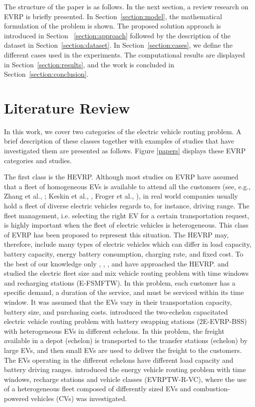 \documentclass[11pt]{article}
\begin{document}
The structure of the paper is as follows. In the next section, a review research on EVRP is briefly presented. In Section~\ref{section:model}, the mathematical formulation of the problem is shown. The proposed solution approach is introduced in Section ~\ref{section:approach} followed by the description of the dataset in Section~\ref{section:dataset}. In Section~\ref{section:cases}, we define the different cases used in the experiments. The computational results are displayed in Section~\ref{section:results}, and the work is concluded in Section~\ref{section:conclusion}.

\section{Literature Review}
In this work, we cover two categories of the electric vehicle routing problem. A brief description of these classes together with examples of studies that have investigated them are presented as follows. Figure \ref{papers} displays these EVRP categories and studies. 

The first class is the HEVRP. Although most studies on EVRP have assumed that a fleet of homogeneous EVs is available to attend all the customers (see, e.g., Zhang et al., \citeyear{zhang2018}; Keskin et al., \citeyear{keskin2019}, Froger et al., \citeyear{Froger2019}), in real world companies usually hold a fleet of diverse electric vehicles regards to, for instance, driving range. The fleet management, i.e. selecting the right EV for a certain transportation request, is highly important when the fleet of electric vehicles is heterogeneous. This class of EVRP has been proposed to represent this situation. The HEVRP may, therefore, include many types of electric vehicles which can differ in load capacity, battery capacity, energy battery consumption, charging rate, and fixed cost. To the best of our knowledge only \cite{Hiermann2016}, \cite{Penha2016}, \cite{Jie2019}, and \cite{Kopfer2019} have approached the HEVRP. \cite{Hiermann2016} and \cite{Penha2016} studied the electric fleet size and mix vehicle routing problem with time windows and recharging stations (E-FSMFTW). In this problem, each customer has a specific demand, a duration of the service, and must be serviced within its time window. It was assumed that the EVs vary in their transportation capacity, battery size, and purchasing costs. \cite{Jie2019} introduced the two-echelon capacitated electric vehicle routing problem with battery swapping stations (2E-EVRP-BSS) with heterogeneous EVs in different echelons. In this problem, the freight available in a depot (echelon) is transported to the transfer stations (echelon) by large EVs, and then small EVs are used to deliver the freight to the customers. The EVs operating in the different echelons have different load capacity and battery driving ranges. \cite{Kopfer2019} introduced the energy vehicle routing problem with time windows, recharge stations and vehicle classes (EVRPTW-R-VC), where the use of a heterogeneous fleet composed of differently sized EVs and combustion-powered vehicles (CVs) was investigated. 
\end{document}

